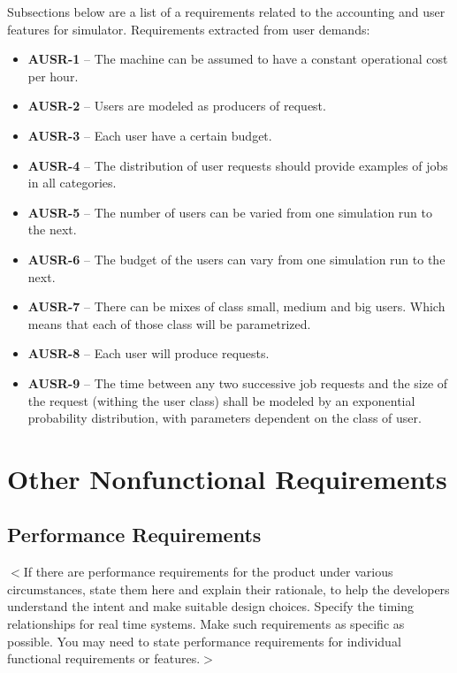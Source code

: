\documentclass{report}
\begin{document}
Subsections below are a list of a requirements related to the accounting and user features for simulator.
Requirements extracted from user demands:
\begin{itemize}
	\item
	{
		\textbf{AUSR-1} -- The machine can be assumed to have a constant operational cost per hour.
	}
	\item
	{
		\textbf{AUSR-2} -- Users are modeled as producers of request.
	}
	\item
	{
		\textbf{AUSR-3} -- Each user have a certain budget.
	}
	\item
	{
		\textbf{AUSR-4} -- The distribution of user requests should provide examples of jobs in all categories.
	}
	\item
	{
		\textbf{AUSR-5} -- The number of users can be varied from one simulation run to the next.
	}
	\item
	{
		\textbf{AUSR-6} -- The budget of the users can vary from one simulation run to the next.
	}
	\item
	{
		\textbf{AUSR-7} -- There can be mixes of class small, medium and big users. Which means that each of those class will be parametrized. 
	}
	\item
	{
		\textbf{AUSR-8} -- Each user will produce requests. 
	}
	\item
	{
		\textbf{AUSR-9} -- The time between any two successive job requests and the size of the request (withing the user class) shall be modeled by an exponential probability distribution, with parameters dependent on the class of user.
	}
\end{itemize}

\chapter{Other Nonfunctional Requirements}

\section{Performance Requirements}
$<$If there are performance requirements for the product under various 
circumstances, state them here and explain their rationale, to help the 
developers understand the intent and make suitable design choices. Specify the 
timing relationships for real time systems. Make such requirements as specific 
as possible. You may need to state performance requirements for individual 
functional requirements or features.$>$
\end{document}
